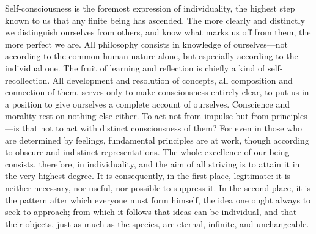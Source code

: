 \documentclass[12pt,a4paper]{article}
\begin{document}
Self-consciousness is the foremost expression of individuality, the highest
step known to us that any finite being has ascended. The more clearly and
distinctly we distinguish ourselves from others, and know what marks us off from
them, the more perfect we are. All philosophy consists in knowledge of
ourselves---not according to the common human nature alone, but especially
according to the individual one. The fruit of learning and reflection is chiefly
a kind of self-recollection. All development and resolution of concepts, all
composition and connection of them, serves only to make consciousness entirely
clear, to put us in a position to give ourselves a complete account of
ourselves. Conscience and morality rest on nothing else either. To act not from
impulse but from principles---is that not to act with distinct consciousness of
them? For even in those who are determined by feelings, fundamental principles
are at work, though according to obscure and indistinct representations. The
whole excellence of our being consists, therefore, in individuality, and the aim
of all striving is to attain it in the very highest degree. It is consequently,
in the first place, legitimate: it is neither necessary, nor useful, nor
possible to suppress it. In the second place, it is the pattern after which
everyone must form himself, the idea one ought always to seek to approach; from
which it follows that ideas can be individual, and that their objects, just as
much as the species, are eternal, infinite, and unchangeable.
\end{document}
